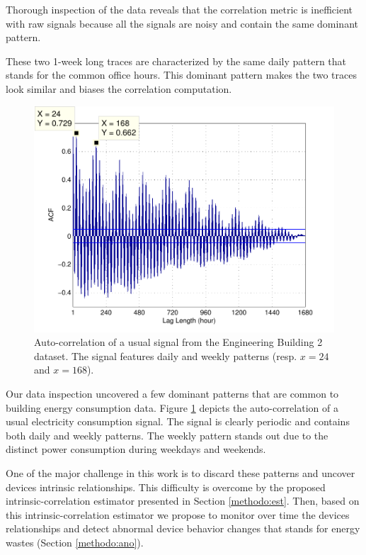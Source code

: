Thorough inspection of the data reveals that the correlation metric is inefficient with raw signals because all the signals are noisy and contain the same dominant pattern.

These two 1-week long traces are characterized by the same daily pattern that stands for the common office hours.
This dominant pattern makes the two traces look similar and biases the correlation computation.

\begin{figure}[t!]
\begin{center}
\includegraphics[width=.45\textwidth]{img/acf_101A1_GHP-eps-converted-to.pdf}
\caption{Auto-correlation of a usual signal from the Engineering Building 2 dataset.
The signal features daily and weekly patterns (resp. $x=24$ and $x=168$).}
\label{fig:autocorr}
\end{center}
\end{figure}

Our data inspection uncovered a few dominant patterns that are common to building energy consumption data.
Figure \ref{fig:autocorr} depicts the auto-correlation of a usual electricity consumption signal.
The signal is clearly periodic and contains both daily and weekly patterns.
The weekly pattern stands out due to the distinct power consumption during weekdays and weekends.

One of the major challenge in this work is to discard these patterns and uncover devices intrinsic relationships.
This difficulty is overcome by the proposed intrinsic-correlation estimator presented in Section \ref{methodo:est}.
Then, based on this intrinsic-correlation estimator we propose to monitor over time the devices relationships and detect abnormal device behavior changes that stands for energy wastes (Section \ref{methodo:ano}).
